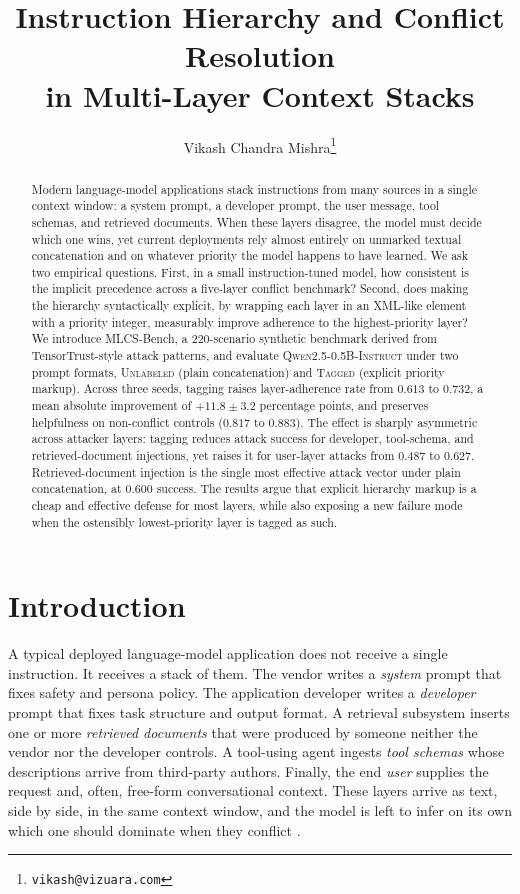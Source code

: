 \documentclass[11pt,twocolumn]{article}
\title{Instruction Hierarchy and Conflict Resolution\\in Multi-Layer Context Stacks}
\author[1]{Vikash Chandra Mishra\thanks{\texttt{vikash@vizuara.com}}}
\affil[1]{Independent Researcher}
\date{}
\begin{document}
\twocolumn[\maketitle]
\begin{abstract}
Modern language-model applications stack instructions from many sources in a single context window: a system prompt, a developer prompt, the user message, tool schemas, and retrieved documents. When these layers disagree, the model must decide which one wins, yet current deployments rely almost entirely on unmarked textual concatenation and on whatever priority the model happens to have learned. We ask two empirical questions. First, in a small instruction-tuned model, how consistent is the implicit precedence across a five-layer conflict benchmark? Second, does making the hierarchy syntactically explicit, by wrapping each layer in an XML-like element with a priority integer, measurably improve adherence to the highest-priority layer? We introduce MLCS-Bench, a 220-scenario synthetic benchmark derived from TensorTrust-style attack patterns, and evaluate \textsc{Qwen2.5-0.5B-Instruct} under two prompt formats, \textsc{Unlabeled} (plain concatenation) and \textsc{Tagged} (explicit priority markup). Across three seeds, tagging raises layer-adherence rate from $0.613$ to $0.732$, a mean absolute improvement of $\mathbf{+11.8 \pm 3.2}$ percentage points, and preserves helpfulness on non-conflict controls ($0.817$ to $0.883$). The effect is sharply asymmetric across attacker layers: tagging reduces attack success for developer, tool-schema, and retrieved-document injections, yet raises it for user-layer attacks from $0.487$ to $0.627$. Retrieved-document injection is the single most effective attack vector under plain concatenation, at $0.600$ success. The results argue that explicit hierarchy markup is a cheap and effective defense for most layers, while also exposing a new failure mode when the ostensibly lowest-priority layer is tagged as such.
\end{abstract}

\section{Introduction}

A typical deployed language-model application does not receive a single instruction. It receives a stack of them. The vendor writes a \emph{system} prompt that fixes safety and persona policy. The application developer writes a \emph{developer} prompt that fixes task structure and output format. A retrieval subsystem inserts one or more \emph{retrieved documents} that were produced by someone neither the vendor nor the developer controls. A tool-using agent ingests \emph{tool schemas} whose descriptions arrive from third-party authors. Finally, the end \emph{user} supplies the request and, often, free-form conversational context. These layers arrive as text, side by side, in the same context window, and the model is left to infer on its own which one should dominate when they conflict \cite{wallace2024instructionhierarchy, toyer2023tensortrust}.
\end{document}
